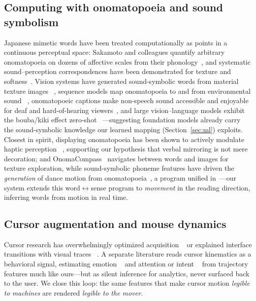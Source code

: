 \documentclass[sigconf,nonacm]{acmart}
\begin{document}
\subsection{Computing with onomatopoeia and sound symbolism}
Japanese mimetic words have been treated computationally as points in a continuous perceptual space: Sakamoto and colleagues quantify arbitrary onomatopoeia on dozens of affective scales from their phonology~\cite{doizaki2017}, and systematic sound--perception correspondences have been demonstrated for texture and softness~\cite{sakamoto2017tactile,nalbantoglu2024softness}. Vision systems have generated sound-symbolic words from material texture images ~\cite{yamagata2021}, sequence models map onomatopoeia to and from environmental sound ~\cite{okamoto2022onomatowave,ikawa2018}, onomatopoeic captions make non-speech sound accessible and enjoyable for deaf and hard-of-hearing viewers~\cite{kim2025onomacap}, and large vision--language models exhibit the bouba/kiki effect zero-shot ~\cite{alper2023kiki}---suggesting foundation models already carry the sound-symbolic knowledge our learned mapping (Section~\ref{sec:ml}) exploits. Closest in spirit, displaying onomatopoeia has been shown to actively modulate haptic perception ~\cite{mizoguchi2025}, supporting our hypothesis that verbal mirroring is not mere decoration; and OnomaCompass~\cite{okamura2026onomacompass} navigates between words and images for texture exploration, while sound-symbolic phoneme features have driven the \emph{generation} of dance motion from onomatopoeia~\cite{okamura2023dance}, a program unified in~\cite{okamura2026thesis}---our system extends this word$\leftrightarrow$sense program to \emph{movement} in the reading direction, inferring words from motion in real time.

\subsection{Cursor augmentation and mouse dynamics}
Cursor research has overwhelmingly optimized acquisition ~\cite{grossman2005bubble} or explained interface transitions with visual traces ~\cite{baudisch2006phosphor}. A separate literature reads cursor kinematics as a behavioral signal, estimating emotion ~\cite{yamauchi2018} and attention or intent ~\cite{arapakis2020} from trajectory features much like ours---but as silent inference for analytics, never surfaced back to the user. We close this loop: the same features that make cursor motion \emph{legible to machines} are rendered \emph{legible to the mover}.
\end{document}
